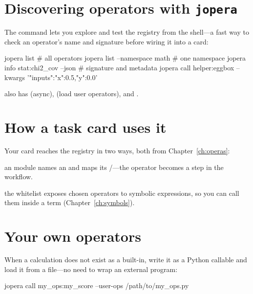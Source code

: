 \section{Discovering operators with \texttt{jopera}}
\label{sec:op-cli}

The  command lets you explore and test the registry from the shell---a fast way to
check an operator's name and signature before wiring it into a card:

\begin{shellbox}
jopera list                       # all operators
jopera list --namespace math      # one namespace
jopera info stat:chi2_cov --json  # signature and metadata
jopera call helper:eggbox --kwargs '{"inputs":{"x":0.5,"y":0.0}}'
\end{shellbox}

\noindent {} also has  (async),  (load user operators), and
.

\section{How a task card uses it}
\label{sec:op-card}

Your card reaches the registry in two ways, both from Chapter~\ref{ch:operas}:

\begin{description}[style=nextline, leftmargin=1.2em]
  \item[As workflow modules] an  module names an  and maps its
        /---the operator becomes a step in the workflow.
  \item[As expression functions] the  whitelist exposes chosen operators
        to symbolic expressions, so you can call them inside a  term
        (Chapter~\ref{ch:symbols}).
\end{description}

\section{Your own operators}
\label{sec:op-user}

When a calculation does not exist as a built-in, write it as a Python callable and load it from a
file---no need to wrap an external program:

\begin{shellbox}
jopera call my_ops:my_score --user-ops /path/to/my_ops.py
\end{shellbox}


